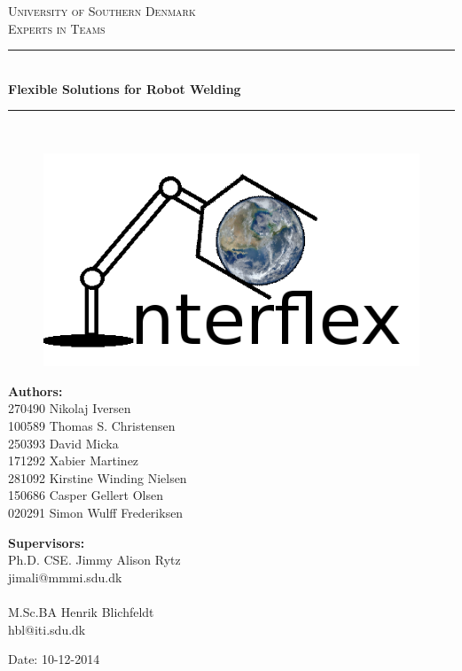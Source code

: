 \begin{titlepage}
\begin{center}

\textsc{\LARGE University of Southern Denmark}\\[1.5cm]
\textsc{\Large Experts in Teams}\\[0.5cm]
\vfill
\hrule ~\\[0.3cm]
{ \huge \bfseries Flexible Solutions for Robot Welding \\[0.4cm] }
\hrule ~\\[1.5cm]
\begin{figure}[!h]
	\centering
	\includegraphics[scale=0.1]{./graphics/logo}
\end{figure}
\vfill

\begin{minipage}[t]{7.9cm}
\begin{flushleft} \large
\textbf{Authors:}\\
270490 Nikolaj Iversen \\
100589 Thomas S. Christensen \\
250393 David Micka \\
171292 Xabier Martinez \\
281092 Kirstine Winding Nielsen \\
150686 Casper Gellert Olsen \\
020291 Simon Wulff Frederiksen\\
\end{flushleft}
\end{minipage}
\begin{minipage}[t]{7.9cm}
\begin{flushright} \large
\textbf{Supervisors:} \\
Ph.D. CSE. Jimmy Alison Rytz \\
jimali@mmmi.sdu.dk\\~\\
M.Sc.BA Henrik Blichfeldt\\
hbl@iti.sdu.dk\\
\end{flushright}
\end{minipage}

\vspace{1.2cm}
Date: 10-12-2014

\end{center}

\end{titlepage}
